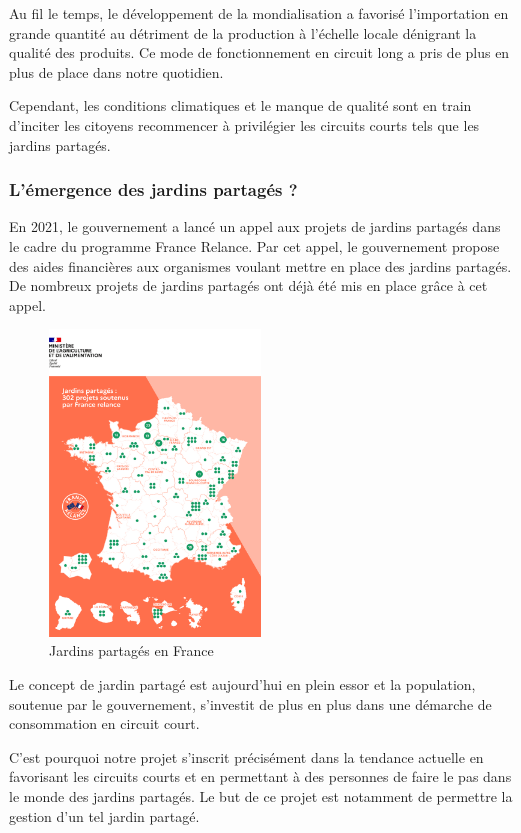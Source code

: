 \documentclass[french,a4paper]{article}
\begin{document}
Au fil le temps, le développement de la mondialisation a favorisé l’importation en grande quantité au détriment de la production à l’échelle locale dénigrant la qualité des produits. Ce mode de fonctionnement en circuit long a pris de plus en plus de place dans notre quotidien. 

Cependant, les conditions climatiques et le manque de qualité sont en train d'inciter les citoyens recommencer à privilégier les circuits courts tels que les jardins partagés.

\subsubsection{L'émergence des jardins partagés ?}

En 2021, le gouvernement a lancé un appel aux projets de jardins partagés dans le cadre du programme France Relance. Par cet appel, le gouvernement propose des aides financières aux organismes voulant mettre en place des jardins partagés. De nombreux projets de jardins partagés ont déjà été mis en place grâce à cet appel.
\begin{figure}[H]
    \centering
    \includegraphics[width=0.5\textwidth]{img/francerelance_carte.png}
    \caption{Jardins partagés en France}
\end{figure}
Le concept de jardin partagé est aujourd’hui en plein essor et la population, soutenue par le gouvernement, s’investit de plus en plus dans une démarche de consommation en circuit court. 

C’est pourquoi notre projet s’inscrit précisément dans la tendance actuelle en favorisant les circuits courts et en permettant à des personnes de faire le pas dans le monde des jardins partagés. Le but de ce projet est notamment de  permettre la gestion d’un tel jardin partagé.
\end{document}
